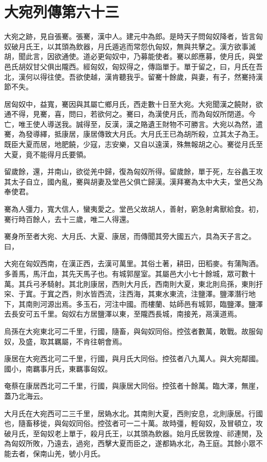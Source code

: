 \chapter{大宛列傳第六十三}

大宛之跡，見自張騫。張騫，漢中人。建元中為郎。是時天子問匈奴降者，皆言匈奴破月氏王，以其頭為飲器，月氏遁逃而常怨仇匈奴，無與共擊之。漢方欲事滅胡，聞此言，因欲通使。道必更匈奴中，乃募能使者。騫以郎應募，使月氏，與堂邑氏胡奴甘父俱出隴西。經匈奴，匈奴得之，傳詣單于。單于留之，曰，月氏在吾北，漢何以得往使。吾欲使越，漢肯聽我乎。留騫十餘歲，與妻，有子，然騫持漢節不失。

居匈奴中，益寬，騫因與其屬亡鄉月氏，西走數十日至大宛。大宛聞漢之饒財，欲通不得，見騫，喜，問曰，若欲何之。騫曰，為漢使月氏，而為匈奴所閉道。今亡，唯王使人導送我。誠得至，反漢，漢之賂遺王財物不可勝言。大宛以為然，遣騫，為發導繹，抵康居，康居傳致大月氏。大月氏王已為胡所殺，立其太子為王。既臣大夏而居，地肥饒，少寇，志安樂，又自以遠漢，殊無報胡之心。騫從月氏至大夏，竟不能得月氏要領。

留歲餘，還，并南山，欲從羌中歸，復為匈奴所得。留歲餘，單于死，左谷蠡王攻其太子自立，國內亂，騫與胡妻及堂邑父俱亡歸漢。漢拜騫為太中大夫，堂邑父為奉使君。

騫為人彊力，寬大信人，蠻夷愛之。堂邑父故胡人，善射，窮急射禽獸給食。初，騫行時百餘人，去十三歲，唯二人得還。

騫身所至者大宛、大月氏、大夏、康居，而傳聞其旁大國五六，具為天子言之。曰，

大宛在匈奴西南，在漢正西，去漢可萬里。其俗土著，耕田，田稻麥。有蒲陶酒。多善馬，馬汗血，其先天馬子也。有城郭屋室。其屬邑大小七十餘城，眾可數十萬。其兵弓矛騎射。其北則康居，西則大月氏，西南則大夏，東北則烏孫，東則扜穼、于窴。于窴之西，則水皆西流，注西海，其東水東流，注鹽澤。鹽澤潛行地下，其南則河源出焉。多玉石，河注中國。而樓蘭、姑師邑有城郭，臨鹽澤。鹽澤去長安可五千里。匈奴右方居鹽澤以東，至隴西長城，南接羌，鬲漢道焉。

烏孫在大宛東北可二千里，行國，隨畜，與匈奴同俗。控弦者數萬，敢戰。故服匈奴，及盛，取其羈屬，不肯往朝會焉。

康居在大宛西北可二千里，行國，與月氏大同俗。控弦者八九萬人。與大宛鄰國。國小，南羈事月氏，東羈事匈奴。

奄蔡在康居西北可二千里，行國，與康居大同俗。控弦者十餘萬。臨大澤，無崖，蓋乃北海云。

大月氏在大宛西可二三千里，居媯水北。其南則大夏，西則安息，北則康居。行國也，隨畜移徙，與匈奴同俗。控弦者可一二十萬。故時彊，輕匈奴，及冒頓立，攻破月氏，至匈奴老上單于，殺月氏王，以其頭為飲器。始月氏居敦煌、祁連閒，及為匈奴所敗，乃遠去，過宛，西擊大夏而臣之，遂都媯水北，為王庭。其餘小眾不能去者，保南山羌，號小月氏。

